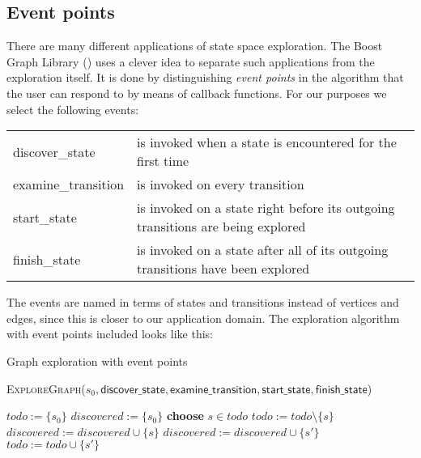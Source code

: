 \documentclass{article}
\begin{document}
\subsection{Event points}
There are many different applications of state space exploration. The Boost Graph Library
(\cite{2002:BGL:504206}) uses a clever idea to separate such applications from the exploration
itself. It is done by distinguishing \emph{event points} in the algorithm that the user can respond
to by means of callback functions. For our purposes we select the following events:

\begin{center}
\label{table:eventpoints}
\begin{tabular}{ |l|l| }
\hline
\textsf{discover\_state} & is invoked when a state is encountered for the first time \\
\textsf{examine\_transition} & is invoked on every transition \\
\textsf{start\_state} & is invoked on a state right before its outgoing transitions are being explored \\
\textsf{finish\_state} & is invoked on a state after all of its outgoing transitions have been explored \\
\hline
\end{tabular}
\end{center}
The events are named in terms of states and transitions instead of vertices and edges, since this is
closer to our application domain. The exploration algorithm with event points included looks like this:

\begin{algorithm}
\small
\caption{Graph exploration with event points}
\vspace*{1ex}
\textsc{ExploreGraph}($s_0, \textsf{discover\_state}, \textsf{examine\_transition}, \textsf{start\_state}, \textsf{finish\_state}$)
\begin{algorithmic}[1]
\State $todo := \{ s_0 \}$
\State $discovered := \{ s_0 \}$
\State {}
  \State \textbf{choose} $s \in todo$
  \State $todo := todo \setminus \{s\}$
  \State {}
  \State $discovered := discovered \cup \{s\}$
      \State $discovered := discovered \cup \{s' \}$
      \State {}
      \State $todo := todo \cup \{ s' \}$
    \EndIf
    \State {}
  \EndFor
  \State {}
\EndWhile
\end{algorithmic}
\end{algorithm}
\end{document}

